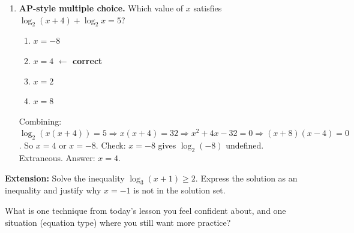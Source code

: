 \documentclass[10pt]{article}
\begin{document}
\begin{enumerate}[leftmargin=1.8em, itemsep=14pt]
\vspace{4pt}
$f^{-1}(x) = $ 

\vspace{6pt}
Domain of $f$:  \qquad Range of $f$: 

\vspace{4pt}
Domain of $f^{-1}$:  \qquad Range of $f^{-1}$: 

\item \textbf{AP-style multiple choice.} Which value of $x$ satisfies
      $\log_2(x+4) + \log_2 x = 5$?

\vspace{6pt}
\begin{enumerate}[leftmargin=2em, itemsep=4pt, label=(\Alph*)]
  \item $x = -8$
  \item $x = 4$ \quad \textcolor{keyred}{\textbf{$\leftarrow$ correct}}
  \item $x = 2$
  \item $x = 8$
\end{enumerate}

\begin{teachernote}
Combining: $\log_2(x(x+4))=5 \Rightarrow x(x+4)=32 \Rightarrow x^2+4x-32=0
\Rightarrow (x+8)(x-4)=0$. So $x=4$ or $x=-8$.
Check: $x=-8$ gives $\log_2(-8)$ undefined. Extraneous. Answer: $x=4$.
\end{teachernote}

\end{enumerate}

\vspace{0.1in}

\begin{extensionbox}
\textbf{Extension:} Solve the inequality $\log_3(x+1) \geq 2$. Express the solution as an
inequality and justify why $x = -1$ is not in the solution set.

\end{extensionbox}

\vspace{0.1in}

\begin{reflectionbox}
What is one technique from today's lesson you feel confident about, and one situation
(equation type) where you still want more practice?

\end{reflectionbox}
\end{document}
